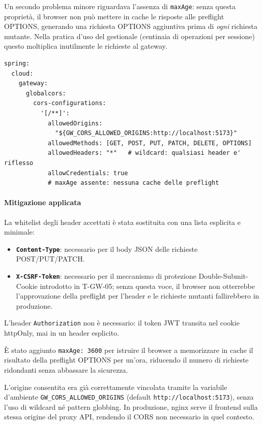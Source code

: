 ﻿\documentclass[a4paper,12pt]{report}
\begin{document}
Un secondo problema minore riguardava l'assenza di \texttt{maxAge}: senza questa
proprietà, il browser non può mettere in cache le risposte alle preflight OPTIONS,
generando una richiesta OPTIONS aggiuntiva prima di \emph{ogni} richiesta mutante.
Nella pratica d'uso del gestionale (centinaia di operazioni per sessione) questo
moltiplica inutilmente le richieste al gateway.

\begin{insecurebox}[title={Configurazione Vulnerabile --- api-gateway.yml (baseline, cors globalcors)}]
\begin{lstlisting}[style=yaml]
spring:
  cloud:
    gateway:
      globalcors:
        cors-configurations:
          '[/**]':
            allowedOrigins:
              "${GW_CORS_ALLOWED_ORIGINS:http://localhost:5173}"
            allowedMethods: [GET, POST, PUT, PATCH, DELETE, OPTIONS]
            allowedHeaders: "*"   # wildcard: qualsiasi header e' riflesso
            allowCredentials: true
            # maxAge assente: nessuna cache delle preflight
\end{lstlisting}
\end{insecurebox}

\paragraph{Mitigazione applicata}
La whitelist degli header accettati è stata sostituita con una lista esplicita e minimale:

\begin{itemize}
  \item \textbf{\texttt{Content-Type}}: necessario per il body JSON delle richieste
        POST/PUT/PATCH.
  \item \textbf{\texttt{X-CSRF-Token}}: necessario per il meccanismo di protezione
        Double-Submit-Cookie introdotto in T-GW-05; senza questa voce, il browser
        non otterrebbe l'approvazione della preflight per l'header e le richieste
        mutanti fallirebbero in produzione.
\end{itemize}

L'header \texttt{Authorization} non è necessario: il token JWT transita nel cookie
httpOnly, mai in un header esplicito.

È stato aggiunto \texttt{maxAge: 3600} per istruire il browser a memorizzare
in cache il risultato della preflight OPTIONS per un'ora, riducendo il numero
di richieste ridondanti senza abbassare la sicurezza.

L'origine consentita era già correttamente vincolata tramite la variabile
d'ambiente \texttt{GW\_CORS\_ALLOWED\_ORIGINS} (default \texttt{http://localhost:5173}),
senza l'uso di wildcard né pattern globbing. In produzione, nginx serve il frontend
sulla stessa origine del proxy API, rendendo il CORS non necessario in quel contesto.
\end{document}

